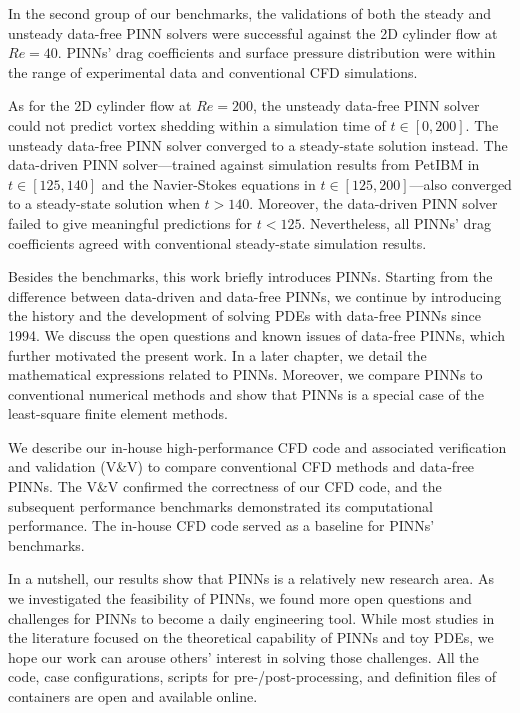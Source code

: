 {In the second group of our benchmarks, the validations of both the steady and unsteady data-free PINN solvers were successful against the 2D cylinder flow at $Re=40$.
PINNs' drag coefficients and surface pressure distribution were within the range of experimental data and conventional CFD simulations.

As for the 2D cylinder flow at $Re=200$, the unsteady data-free PINN solver could not predict vortex shedding within a simulation time of $t\in[0, 200]$.
The unsteady data-free PINN solver converged to a steady-state solution instead.
The data-driven PINN solver---trained against simulation results from PetIBM in $t \in [125, 140]$ and the Navier-Stokes equations in $t\in[125, 200]$---also converged to a steady-state solution when $t > 140$.
Moreover, the data-driven PINN solver failed to give meaningful predictions for $t<125$.
Nevertheless, all PINNs' drag coefficients agreed with conventional steady-state simulation results.

Besides the benchmarks, this work briefly introduces PINNs.
Starting from the difference between data-driven and data-free PINNs, we continue by introducing the history and the development of solving PDEs with data-free PINNs since 1994.
We discuss the open questions and known issues of data-free PINNs, which further motivated the present work.
In a later chapter, we detail the mathematical expressions related to PINNs.
Moreover, we compare PINNs to conventional numerical methods and show that PINNs is a special case of the least-square finite element methods.

We describe our in-house high-performance CFD code and associated verification and validation (V\&V) to compare conventional CFD methods and data-free PINNs.
The V\&V confirmed the correctness of our CFD code, and the subsequent performance benchmarks demonstrated its computational performance.
The in-house CFD code served as a baseline for PINNs' benchmarks.

In a nutshell, our results show that PINNs is a relatively new research area.
As we investigated the feasibility of PINNs, we found more open questions and challenges for PINNs to become a daily engineering tool.
While most studies in the literature focused on the theoretical capability of PINNs and toy PDEs, we hope our work can arouse others' interest in solving those challenges.
All the code, case configurations, scripts for pre-/post-processing, and definition files of containers are open and available online.
}
